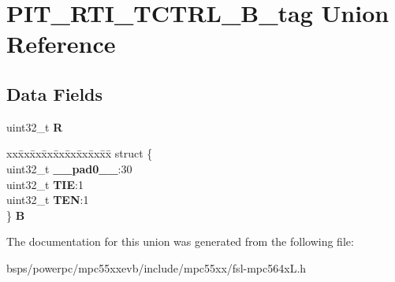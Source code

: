\hypertarget{unionPIT__RTI__TCTRL__32B__tag}{}\section{P\+I\+T\+\_\+\+R\+T\+I\+\_\+\+T\+C\+T\+R\+L\+\_\+B\+\_\+tag Union Reference}
\label{unionPIT__RTI__TCTRL__32B__tag}
\subsection*{Data Fields}
\begin{DoxyCompactItemize}
\item 
\mbox{\label{unionPIT__RTI__TCTRL__32B__tag_a26a51140ecd3d30f628f42f4e17d2adc}} 
uint32\+\_\+t {\bfseries R}
\item 
\mbox{\label{unionPIT__RTI__TCTRL__32B__tag_a104f7d586e5afdf58807c7547aeb7765}} 
\begin{tabbing}
xx\=xx\=xx\=xx\=xx\=xx\=xx\=xx\=xx\=\kill
struct \{\\
\>uint32\_t {\bfseries \_\_pad0\_\_}:30\\
\>uint32\_t {\bfseries TIE}:1\\
\>uint32\_t {\bfseries TEN}:1\\
\} {\bfseries B}\\

\end{tabbing}\end{DoxyCompactItemize}


The documentation for this union was generated from the following file\+:\begin{DoxyCompactItemize}
\item 
bsps/powerpc/mpc55xxevb/include/mpc55xx/fsl-\/mpc564x\+L.\+h\end{DoxyCompactItemize}
